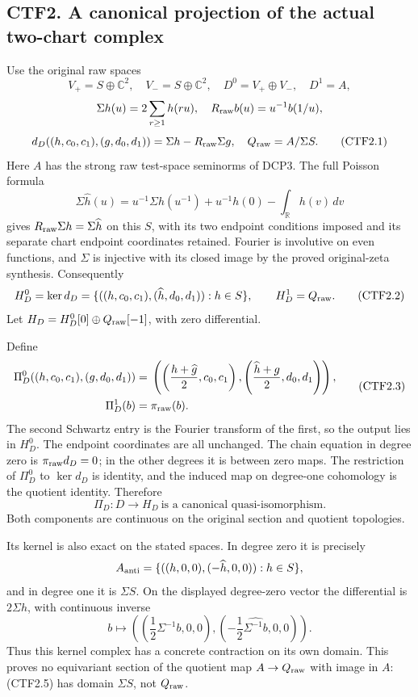 \subsection{CTF2. A canonical projection of the actual two-chart
complex}\label{ctf2.-a-canonical-projection-of-the-actual-two-chart-complex}

Use the original raw spaces \[
V_+=S\oplus\mathbb C^2,\quad V_-=S\oplus\mathbb C^2,\quad
D^0=V_+\oplus V_-,\quad D^1=A,
\] \[
\Sigma h(u)=2\sum_{r\ge1}h(ru),\quad R_{\rm raw}b(u)=u^{-1}b(1/u),
\] \[
d_D((h,c_0,c_1),(g,d_0,d_1))=\Sigma h-R_{\rm raw}\Sigma g,
\quad Q_{\rm raw}=A/\Sigma S.
\tag{CTF2.1}
\] Here \(A\) has the strong raw test-space seminorms of DCP3. The full
Poisson formula \[
\Sigma\widehat h(u)=u^{-1}\Sigma h(u^{-1})
+u^{-1}h(0)-\int_{\mathbb R}h(v)\,dv
\] gives \(R_{\rm raw}\Sigma h=\Sigma\widehat h\) on this \(S\), with
its two endpoint conditions imposed and its separate chart endpoint
coordinates retained. Fourier is involutive on even functions, and
\(\Sigma\) is injective with its closed image by the proved
original-zeta synthesis. Consequently \[
H_D^0=\ker d_D
=\{((h,c_0,c_1),(\widehat h,d_0,d_1)):h\in S\},\qquad
H_D^1=Q_{\rm raw}.
\tag{CTF2.2}
\] Let \(H_D=H_D^0[0]\oplus Q_{\rm raw}[-1]\), with zero differential.

Define \[
\begin{aligned}
\Pi_D^0((h,c_0,c_1),(g,d_0,d_1))
={}&\left(\left(\frac{h+\widehat g}{2},c_0,c_1\right),
\left(\frac{\widehat h+g}{2},d_0,d_1\right)\right),\\
\Pi_D^1(b)={}&\pi_{\rm raw}(b).
\end{aligned}
\tag{CTF2.3}
\] The second Schwartz entry is the Fourier transform of the first, so
the output lies in \(H_D^0\). The endpoint coordinates are all
unchanged. The chain equation in degree zero is \(\pi_{\rm raw}d_D=0\);
in the other degrees it is between zero maps. The restriction of
\(\Pi_D^0\) to \(\ker d_D\) is identity, and the induced map on
degree-one cohomology is the quotient identity. Therefore \[
\boxed{\Pi_D:D\longrightarrow H_D\ \text{is a canonical quasi-isomorphism}.}
\tag{CTF2.4}
\] Both components are continuous on the original section and quotient
topologies.

Its kernel is also exact on the stated spaces. In degree zero it is
precisely \[
A_{\rm anti}=
\{((h,0,0),(-\widehat h,0,0)):h\in S\},
\] and in degree one it is \(\Sigma S\). On the displayed degree-zero
vector the differential is \(2\Sigma h\), with continuous inverse \[
b\longmapsto
\left(\left(\frac12\Sigma^{-1}b,0,0\right),
\left(-\frac12\widehat{\Sigma^{-1}b},0,0\right)\right).
\tag{CTF2.5}
\] Thus this kernel complex has a concrete contraction on its own
domain. This proves no equivariant section of the quotient map
\(A\to Q_{\rm raw}\) with image in \(A\): (CTF2.5) has domain
\(\Sigma S\), not \(Q_{\rm raw}\).

